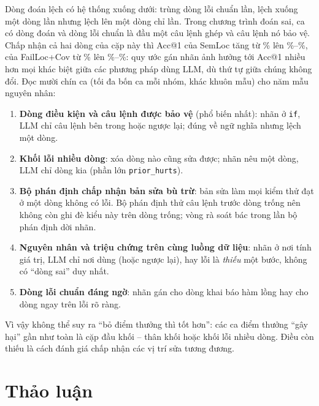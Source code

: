 Dòng đoán lệch có hệ thống xuống dưới: trùng dòng lỗi chuẩn \OffLlmGuessZeroCount{} lần, lệch xuống một dòng
\OffLlmGuessOneCount{} lần nhưng lệch lên một dòng chỉ \OffLlmGuessMinusOneCount{} lần. Trong \FailWrongGuessN{} chương
trình đoán sai, \FailRelationHeaderBodyN{} ca có dòng đoán và dòng lỗi chuẩn là đầu một câu lệnh ghép và câu lệnh nó bảo
vệ. Chấp nhận cả hai dòng của cặp này thì Acc@1 của SemLoc tăng từ \TolSemlocAccOneExact\% lên
\TolSemlocAccOneGuardStrict\%--\TolSemlocAccOneGuardOrBody\%, của FailLoc+Cov từ \TolLlmCoverageAccOneExact\% lên
\TolLlmCoverageAccOneGuardStrict\%--\TolLlmCoverageAccOneGuardOrBody\%: quy ước gán nhãn ảnh hưởng tới Acc@1 nhiều hơn
mọi khác biệt giữa các phương pháp dùng LLM, dù thứ tự giữa chúng không đổi. Đọc mười chín ca (tối đa bốn ca mỗi nhóm,
khác khuôn mẫu) cho năm mẫu nguyên nhân:
\begin{enumerate}
\item \textbf{Dòng điều kiện và câu lệnh được bảo vệ} (phổ biến nhất): nhãn ở \texttt{if}, LLM chỉ câu lệnh bên trong
  hoặc ngược lại; đúng về ngữ nghĩa nhưng lệch một dòng.
\item \textbf{Khối lỗi nhiều dòng}: xóa dòng nào cũng sửa được; nhãn nêu một dòng, LLM chỉ dòng kia (phần lớn \texttt{prior\_hurts}).
\item \textbf{Bộ phán định chấp nhận bản sửa bù trừ}: bản sửa làm mọi kiểm thử đạt ở một dòng không có lỗi. Bộ phán định
  thử câu lệnh trước dòng trống nên không còn ghi đè kiểu này trên dòng trống; vòng rà soát bác \ReviewCorrectedOverturnedN{} trong
  \GtCorrectedN{} lần bộ phán định dời nhãn.
\item \textbf{Nguyên nhân và triệu chứng trên cùng luồng dữ liệu}: nhãn ở nơi tính giá trị, LLM chỉ nơi dùng (hoặc ngược
  lại), hay lỗi là \emph{thiếu} một bước, không có ``dòng sai'' duy nhất.
\item \textbf{Dòng lỗi chuẩn đáng ngờ}: nhãn gán cho dòng khai báo hàm lồng hay cho dòng ngay trên lỗi rõ ràng.\end{enumerate}
Vì vậy không thể suy ra ``bỏ điểm thưởng thì tốt hơn'': các ca điểm thưởng ``gây hại'' gần như toàn là cặp đầu khối --
thân khối hoặc khối lỗi nhiều dòng. Điều còn thiếu là cách đánh giá chấp nhận các vị trí sửa tương đương.

\section{Thảo luận}
\label{sec:thao-luan}

